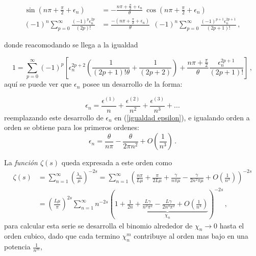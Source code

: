 \begin{equation}
\begin{aligned}
    \sin \left( n \pi + \frac{\pi}{2} + \epsilon _n \right) &= 
    - \frac{n \pi + \frac{\pi}{2} + \epsilon _n}{\theta}  \ \cos \left( n \pi + \frac{\pi}{2} + \epsilon _n \right)  \\[5pt]
         (-1) ^n \sum _{p=0} ^{\infty} \frac{(-1) ^p  \epsilon _n ^{2 p }}{(2p)!} 
    &=  \frac{-(n \pi + \frac{\pi}{2} + \epsilon _n) }{\theta}  \  \	
    (-1) ^n
     \sum _{p=0} ^{\infty} \frac{(-1) ^ {p+1} \epsilon _n ^{2 p + 1}}{(2p+1)!} 
     \, ,
\end{aligned}
\end{equation}


donde reacomodando se llega a la igualdad

\begin{equation}
    1 = 
    \sum _{p=0} ^{\infty} (-1) ^p     \left[
   	\epsilon _n ^{2p+2 }\left( \frac{1}{(2p+1)! \theta } + \frac{1}{(2p+2)} \right) +
  	\frac{n \pi + \frac{\pi}{2}}{\theta} \frac{  \epsilon _n ^{2p+1}}{(2p+1)!} 			\right]
  	\, ,
\label{igualdad epsilon}
\end{equation}
aquí se puede ver que  $\epsilon _n $ posee un desarrollo de la forma:

\begin{equation}
    \epsilon _n = 
    \frac{\epsilon ^{(1)}}{n}  + 
    \frac{\epsilon ^{(2)}}{n ^2}  + 
    \frac{\epsilon ^{(3)}}{n ^3}  + ...
\label{eq.epsilon}
\end{equation}
reemplazando este desarrollo de $\epsilon _n$ en (\ref{igualdad epsilon}), e igualando orden a orden se obtiene para los primeros ordenes:
\begin{equation}
    \epsilon _n = \frac{\theta}{n \pi} 
     - \frac{ \theta}{2 \pi n ^2 } + O \left( \frac{1}{n ^3}\right) 
     \, .
\label{epsilons}
\end{equation}

\newpage


La  {\it función $\zeta (s)$} queda expresada a este orden como
\begin{equation}
\begin{aligned}
    \zeta  (s) &=  
    \sum _{n=1} ^{\infty} 
    \left( \frac{\lambda _n }{\mu} 
    	\right) ^ {-2 s}  =
    \sum _{n=1} ^{\infty} 
    \left(
	\frac{n \pi}{L \mu} + 
    \frac{\pi}{2 L \mu} +
    \frac{\gamma}{n \pi \mu } -
    \frac{\gamma}{2 n ^2 \pi \mu } +
    O \left(  \frac{1}{n^3} \right) 
    \right) ^{-2 s}  \\[5pt]
    &= \left( \frac{L \mu }{\pi} \right) ^{2s}    
    \sum _{n=1} ^{\infty} 
    n ^{- 2 s} 
    \left(
    1 +     
    \underbrace{
        \frac{1}{2 n} + 
        \frac{L \gamma}{n^2 \pi ^2} -
        \frac{L \gamma}{2 n ^3 \pi ^2} +
        O \left( \frac{1}{n ^{4}} \right) } _{ \chi _n}
    \right ) ^{-2 s}
    \, ,
\end{aligned}
\end{equation}
para calcular esta serie se desarrolla el binomio alrededor de $\chi _n \rightarrow{0} $ hasta el orden cubico, dado que  cada termino $\chi _{n} ^{m} $ contribuye al orden mas bajo en una potencia $\frac{1}{n ^m}$,


